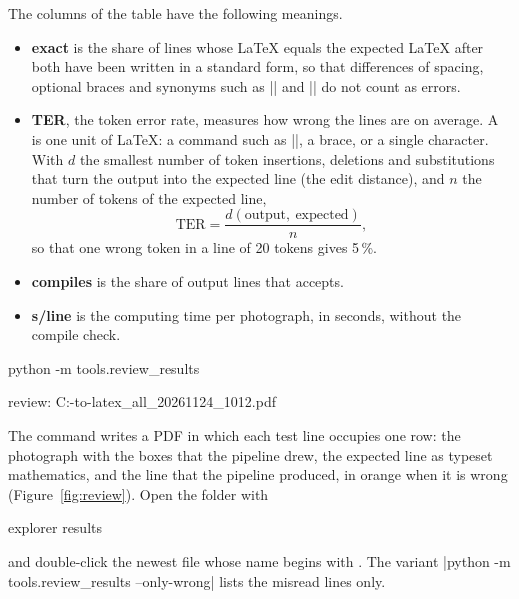 The columns of the table have the following meanings.
\begin{itemize}
\item \textbf{exact} is the share of lines whose \LaTeX{} equals the expected \LaTeX{} after both
  have been written in a standard form, so that differences of spacing, optional braces and
  synonyms such as \code|\le| and \code|\leq| do not count as errors.
\item \textbf{TER}, the token error rate, measures how wrong the lines are on average. A
   is one unit of \LaTeX{}: a command such as \code|\alpha|, a brace, or a single
  character. With $d$ the smallest number of token insertions, deletions and substitutions that
  turn the output into the expected line (the edit distance), and $n$ the number of tokens of
  the expected line,
  \[
    \mathrm{TER} = \frac{d(\text{output},\ \text{expected})}{n} ,
  \]
  so that one wrong token in a line of 20 tokens gives 5\,\%.
\item \textbf{compiles} is the share of output lines that  accepts.
\item \textbf{s/line} is the computing time per photograph, in seconds, without the compile
  check.
\end{itemize}



\label{st:review}
\begin{ps}
python -m tools.review_results
\end{ps}
\begin{out}
review: C:\camera-to-latex\results\review_all_20261124_1012.pdf
\end{out}
The command writes a PDF in which each test line occupies one row: the photograph with the
boxes that the pipeline drew, the expected line as typeset mathematics, and the line that the
pipeline produced, in orange when it is wrong (Figure~\ref{fig:review}). Open the folder with
\begin{ps}
explorer results
\end{ps}
and double-click the newest file whose name begins with . The variant
\code|python -m tools.review_results --only-wrong| lists the misread lines only.

